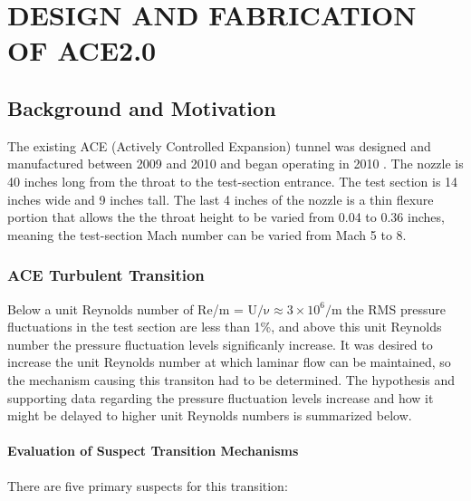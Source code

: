 %
%  
%



\chapter{DESIGN AND FABRICATION OF ACE2.0}

\section{Background and Motivation}

The existing ACE (Actively Controlled Expansion) tunnel was designed and manufactured between 2009 and 2010 and began operating in 2010 \cite{ace09,ace10-calibrate,tichenor-dis}. The nozzle is 40 inches long from the throat to the test-section entrance. The test section is 14 inches wide and 9 inches tall. The last 4 inches of the nozzle is a thin flexure portion that allows the the throat height to be varied from 0.04 to 0.36 inches, meaning the test-section Mach number can be varied from Mach 5 to 8.

\subsection{ACE Turbulent Transition}

Below a unit Reynolds number of Re/m = $\mathrm{U/\nu \approx 3 \times 10^6/\mathrm{m}}$ the RMS pressure fluctuations in the test section are less than 1\%, and above this unit Reynolds number the pressure fluctuation levels significanly increase. It was desired to increase the unit Reynolds number at which laminar flow can be maintained, so the mechanism causing this transiton had to be determined. The hypothesis and supporting data regarding the pressure fluctuation levels increase and how it might be delayed to higher unit Reynolds numbers is summarized below.

\subsubsection{Evaluation of Suspect Transition Mechanisms}

There are five primary suspects for this transition:

